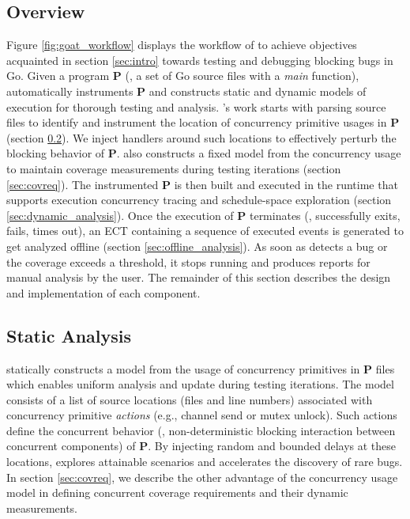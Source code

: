 \subsection{Overview}
\label{sec:overview}
Figure \ref{fig:goat_workflow} displays the workflow of \goat to achieve objectives acquainted in section \ref{sec:intro} towards testing and debugging blocking bugs in Go.
%
Given a program \textbf{P} (\ie, a set of Go source files with a \textit{main} function), \goat automatically instruments \textbf{P} and constructs static and dynamic models of execution for thorough testing and analysis.
%
\goat's work starts with parsing source files to identify and instrument the location of concurrency primitive usages in \textbf{P} (section \ref{sec:static_analysis}).
%
We inject \goat handlers around such locations to effectively perturb the blocking behavior of \textbf{P}.
%
\goat also constructs a fixed model from the concurrency usage to maintain coverage measurements during testing iterations (section \ref{sec:covreq}).
%
The instrumented \textbf{P} is then built and executed in the \goat runtime that supports execution concurrency tracing and schedule-space exploration (section \ref{sec:dynamic_analysis}).
%
Once the execution of \textbf{P} terminates (\eg, successfully exits, fails, times out), an ECT containing a sequence of executed events is generated to get analyzed offline (section \ref{sec:offline_analysis}).
%
As soon as \goat detects a bug or the coverage exceeds a threshold, it stops running and produces reports for manual analysis by the user.
%
The remainder of this section describes the design and implementation of each component.

\subsection{Static Analysis}
\label{sec:static_analysis}

\goat statically constructs a model from the usage of concurrency primitives in \textbf{P} files which enables uniform analysis and update during testing iterations.
%
The model consists of a list of source locations (files and line numbers) associated with concurrency primitive \textit{actions} (e.g., channel send or mutex unlock).
%
Such actions define the concurrent behavior (\ie, non-deterministic blocking interaction between concurrent components) of \textbf{P}.
%
By injecting random and bounded delays at these locations, \goat explores attainable scenarios and accelerates the discovery of rare bugs.
%
In section \ref{sec:covreq}, we describe the other advantage of the concurrency usage model in defining concurrent coverage requirements and their dynamic measurements.
%

